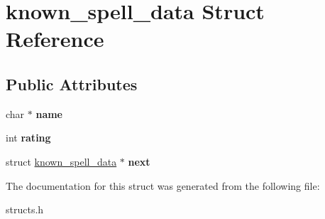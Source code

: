 \hypertarget{structknown__spell__data}{\section{known\-\_\-spell\-\_\-data Struct Reference}
\label{structknown__spell__data}
}
\subsection*{Public Attributes}
\begin{DoxyCompactItemize}
\item 
\hypertarget{structknown__spell__data_aa78f9f7af67470ef5b565248b691784e}{char $\ast$ {\bfseries name}}\label{structknown__spell__data_aa78f9f7af67470ef5b565248b691784e}

\item 
\hypertarget{structknown__spell__data_a8ae3ad2d4386467a83a50b64967a44c5}{int {\bfseries rating}}\label{structknown__spell__data_a8ae3ad2d4386467a83a50b64967a44c5}

\item 
\hypertarget{structknown__spell__data_aec77da24e3bbece669ea59a24d12517b}{struct \hyperlink{structknown__spell__data}{known\-\_\-spell\-\_\-data} $\ast$ {\bfseries next}}\label{structknown__spell__data_aec77da24e3bbece669ea59a24d12517b}

\end{DoxyCompactItemize}


The documentation for this struct was generated from the following file\-:\begin{DoxyCompactItemize}
\item 
structs.\-h\end{DoxyCompactItemize}
